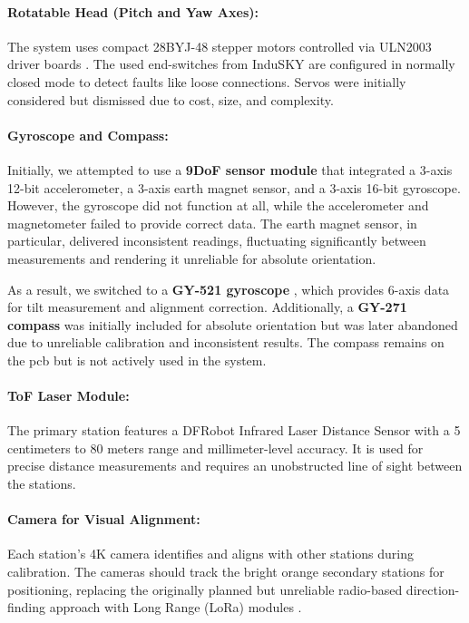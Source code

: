 \paragraph{Rotatable Head (Pitch and Yaw Axes):}
The system uses compact 28BYJ-48 stepper motors controlled via ULN2003 driver boards \cite{angeek_28byj_48}. The used end-switches from InduSKY \cite{indusky_microswitch} are configured in normally closed mode to detect faults like loose connections. Servos \cite{miuzei_servos} were initially considered but dismissed due to cost, size, and complexity.

\paragraph{Gyroscope and Compass:}

Initially, we attempted to use a \textbf{9DoF sensor module} \citep{jwbl_dof_sensor} that integrated a 3-axis 12-bit accelerometer, a 3-axis earth magnet sensor, and a 3-axis 16-bit gyroscope. However, the gyroscope did not function at all, while the accelerometer and magnetometer failed to provide correct data. The earth magnet sensor, in particular, delivered inconsistent readings, fluctuating significantly between measurements and rendering it unreliable for absolute orientation.

As a result, we switched to a \textbf{GY-521 gyroscope} \cite{azdelivery_gy_521}, which provides 6-axis data for tilt measurement and alignment correction. Additionally, a \textbf{GY-271 compass} \cite{azdelivery_gy_271} was initially included for absolute orientation but was later abandoned due to unreliable calibration and inconsistent results. The compass remains on the \acrshort{pcb} but is not actively used in the system.

\paragraph{ToF Laser Module:}
The primary station features a DFRobot Infrared Laser Distance Sensor \cite{dfrobot_ir_sensor} with a 5 centimeters to 80 meters range and millimeter-level accuracy. It is used for precise distance measurements and requires an unobstructed line of sight between the stations.

\paragraph{Camera for Visual Alignment:}
Each station’s 4K camera \cite{armsom_camera_module} identifies and aligns with other stations during calibration. The cameras should track the bright orange secondary stations for positioning, replacing the originally planned but unreliable radio-based direction-finding approach with Long Range (LoRa) modules \cite{tecnoio_lora_modules}.

